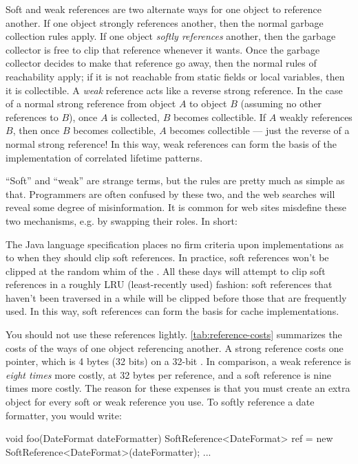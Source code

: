 Soft and weak references are two alternate ways for one object to reference
another. If one object strongly references another, then the normal garbage
collection rules apply. If one object \emph{softly references} another, then
the garbage collector is free to clip that reference whenever it wants. Once the
garbage collector decides to make that reference go away, then the normal rules
of reachability apply; if it is not reachable from static fields or local
variables, then it is collectible.
A \emph{weak} reference acts like a reverse strong reference. In the case of a
normal strong reference from object $A$ to object $B$ (assuming no other
references to $B$), once $A$ is collected, $B$ becomes collectible. If $A$
weakly references $B$, then once $B$ becomes collectible, $A$ becomes
collectible --- just the reverse of a normal strong reference! In this way, weak
references can form the basis of the implementation of correlated lifetime
patterns.

``Soft'' and ``weak'' are strange terms, but the rules are pretty much as simple
as that. Programmers are often confused by these two, and the web searches will
reveal some degree of misinformation. It is common for web sites misdefine
these two mechanisms, e.g. by swapping their roles. In short:

 
The Java language specification places no firm criteria upon \jre
implementations as to when they should clip soft references. In practice, soft
references won't be clipped at the random whim of the \jre. All \jres these days
will attempt to clip soft references in a roughly LRU (least-recently used)
fashion: soft references that haven't been traversed in a while will be clipped
before those that are frequently used. In this way, soft references can form the
basis for cache implementations.

You should not use these references lightly. \autoref{tab:reference-costs}
summarizes the costs of the ways of one object referencing another. A strong
reference costs one pointer, which is 4 bytes (32 bits) on a 32-bit \jre. In
comparison, a weak reference is \emph{eight times} more costly, at 32 bytes per
reference, and a soft reference is nine times more costly. The reason for these
expenses is that you must create an extra  object for
every soft or weak reference you use. To softly reference a date formatter,
you would write:
\begin{shortlisting}
void foo(DateFormat dateFormatter) {
   SoftReference<DateFormat> ref = new SoftReference<DateFormat>(dateFormatter);
   ...
}
\end{shortlisting}

